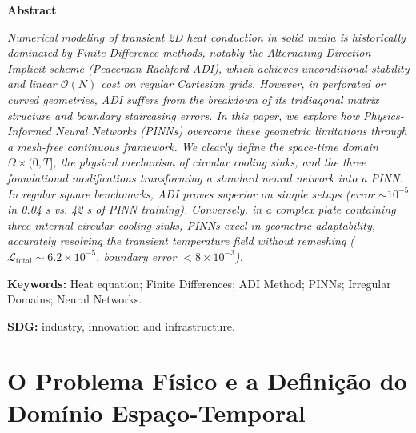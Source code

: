 \documentclass[11pt,a4paper]{article}
\begin{document}
\vspace{0.3em}
\begin{center}
\textbf{Abstract}
\end{center}
\vspace{-0.5em}
\noindent
\small\textit{Numerical modeling of transient 2D heat conduction in solid media is historically dominated by Finite Difference methods, notably the Alternating Direction Implicit scheme (Peaceman-Rachford ADI), which achieves unconditional stability and linear $\mathcal{O}(N)$ cost on regular Cartesian grids. However, in perforated or curved geometries, ADI suffers from the breakdown of its tridiagonal matrix structure and boundary staircasing errors. In this paper, we explore how Physics-Informed Neural Networks (PINNs) overcome these geometric limitations through a mesh-free continuous framework. We clearly define the space-time domain $\Omega \times (0, T]$, the physical mechanism of circular cooling sinks, and the three foundational modifications transforming a standard neural network into a PINN. In regular square benchmarks, ADI proves superior on simple setups (error $\sim 10^{-5}$ in 0.04 s vs. 42 s of PINN training). Conversely, in a complex plate containing three internal circular cooling sinks, PINNs excel in geometric adaptability, accurately resolving the transient temperature field without remeshing ($\mathcal{L}_{\text{total}} \sim 6.2 \times 10^{-5}$, boundary error $< 8 \times 10^{-3}$).}

\vspace{0.35em}
\noindent
\textbf{Keywords:} Heat equation; Finite Differences; ADI Method; PINNs; Irregular Domains; Neural Networks.

\vspace{0.2em}
\noindent
\textbf{SDG:} industry, innovation and infrastructure.
\normalsize

\section{O Problema Físico e a Definição do Domínio Espaço-Temporal}
\end{document}

